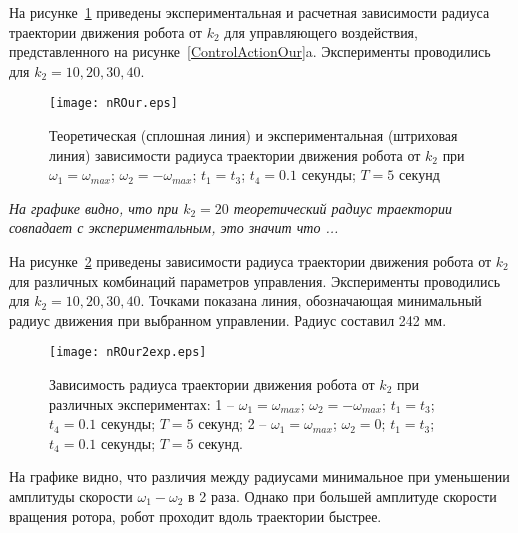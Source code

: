 На рисунке~\ref{nROur} приведены экспериментальная и расчетная зависимости радиуса траектории движения робота от $k_2$ для управляющего воздействия, представленного на рисунке~\ref{ControlActionOur}a. Эксперименты проводились для $ k_2=10,20,30,40 $.

\begin{figure}[!ht]
	\centering
	\texttt{[image: nROur.eps]}
	\caption{Теоретическая (сплошная линия) и экспериментальная (штриховая линия) зависимости радиуса траектории движения робота от $k_2$ при $\omega_1 = \omega_{max} $; $ \omega_2 = -\omega_{max} $; $ t_1=t_3 $; $ t_4=0.1 $ секунды; $ T = 5 $ секунд}
	\label{nROur}
\end{figure}

\textit{На графике видно, что при $ k_2=20 $ теоретический радиус траектории совпадает с экспериментальным, это значит что ...}

На рисунке~\ref{nROur2exp} приведены зависимости радиуса траектории движения робота от $k_2$ для различных комбинаций параметров управления. Эксперименты проводились для $ k_2=10,20,30,40 $. Точками показана линия, обозначающая минимальный радиус движения при выбранном управлении. Радиус составил 242 мм.

\begin{figure}[!ht]
	\centering
	\texttt{[image: nROur2exp.eps]}
	\caption{Зависимость радиуса траектории движения робота от $k_2$ при различных экспериментах: 1 -- $\omega_1 = \omega_{max} $; $ \omega_2 = -\omega_{max} $; $ t_1=t_3 $; $ t_4=0.1 $ секунды; $ T = 5 $ секунд; 2 -- $\omega_1 = \omega_{max} $; $ \omega_2 = 0 $; $ t_1=t_3 $; $ t_4=0.1 $ секунды; $ T = 5 $ секунд.}
	\label{nROur2exp}
\end{figure}

На графике видно, что различия между радиусами минимальное при уменьшении амплитуды скорости $ \omega_1 - \omega_2 $ в 2 раза. Однако при большей амплитуде скорости вращения ротора, робот проходит вдоль траектории быстрее.


\clearpage